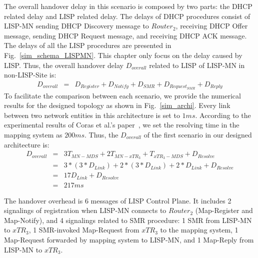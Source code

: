 The overall handover delay in this scenario is composed by two parts: the DHCP related delay and LISP related delay. The delays of DHCP procedures consist of LISP-MN sending DHCP Discovery message to $Router_2$, receiving DHCP Offer message, sending DHCP Request message, and receiving DHCP ACK message. The delays of all the LISP procedures are presented in Fig.~\ref{sim_schema_LISPMN}. This chapter only focus on the delay caused by LISP. Thus, the overall handover delay $D_{overall}$ related to LISP of LISP-MN in non-LISP-Site is:
\begin{eqnarray}
D_{overall} &=& D_{Register} + D_{Notify} + D_{SMR} + D_{Request_{SMR}} + D_{Reply} 
\end{eqnarray}
To facilitate the comparison between each scenario, we provide the numerical results for the designed topology as shown in Fig.~\ref{sim_archi}. Every link between two network entities in this architecture is set to $1 ms$. According to the experimental results of Coras et al.'s paper~\cite{coras2014performance}, we set the resolving time in the mapping system as $200 ms$. Thus, the $D_{overall}$ of the first scenario in our designed architecture is:
\begin{eqnarray}
D_{overall} &=& 3T_{MN-MDS} + 2T_{MN-xTR_3} + T_{xTR_3-MDS} + D_{Resolve} \nonumber \\
&=& 3* (3*D_{Link}) + 2*(3*D_{Link}) + 2*D_{Link} + D_{Resolve}\nonumber \\
&=& 17D_{Link} + D_{Resolve} \nonumber \\
&=& 217 ms \nonumber
\end{eqnarray}

The handover overhead is 6 messages of LISP Control Plane. It includes 2 signalings of registration when LISP-MN connects to $Router_2$ (Map-Register and Map-Notify), and 4 signalings related to SMR procedure: 1 SMR from LISP-MN to $xTR_3$, 1 SMR-invoked Map-Request from $xTR_3$ to the mapping system, 1 Map-Request forwarded by mapping system to LISP-MN, and 1 Map-Reply from LISP-MN to $xTR_3$.

